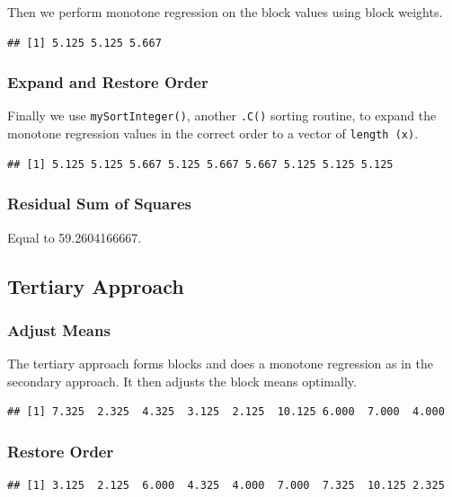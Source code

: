 \documentclass[12pt,]{article}
\begin{document}
Then we perform monotone regression on the block values using block
weights.

\begin{verbatim}
## [1] 5.125 5.125 5.667
\end{verbatim}

\subsubsection{Expand and Restore Order}\label{expand-and-restore-order}

Finally we use \texttt{mySortInteger()}, another \texttt{.C()} sorting
routine, to expand the monotone regression values in the correct order
to a vector of \texttt{length\ (x)}.

\begin{verbatim}
## [1] 5.125 5.125 5.667 5.125 5.667 5.667 5.125 5.125 5.125
\end{verbatim}

\subsubsection{Residual Sum of Squares}\label{residual-sum-of-squares-1}

Equal to 59.2604166667.

\subsection{Tertiary Approach}\label{tertiary-approach}

\subsubsection{Adjust Means}\label{adjust-means}

The tertiary approach forms blocks and does a monotone regression as in
the secondary approach. It then adjusts the block means optimally.

\begin{verbatim}
## [1] 7.325  2.325  4.325  3.125  2.125  10.125 6.000  7.000  4.000
\end{verbatim}

\subsubsection{Restore Order}\label{restore-order-1}

\begin{verbatim}
## [1] 3.125  2.125  6.000  4.325  4.000  7.000  7.325  10.125 2.325
\end{verbatim}
\end{document}
